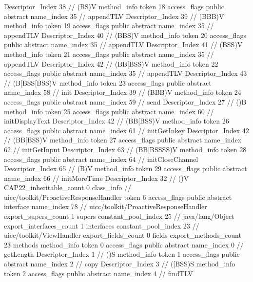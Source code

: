 {{{{{					Descriptor_Index	38		// (BS)V
				}
				method_info {
					token	18
					access_flags	public abstract
					name_index	35		// appendTLV
					Descriptor_Index	39		// (BBB)V
				}
				method_info {
					token	19
					access_flags	public abstract
					name_index	35		// appendTLV
					Descriptor_Index	40		// (BBS)V
				}
				method_info {
					token	20
					access_flags	public abstract
					name_index	35		// appendTLV
					Descriptor_Index	41		// (BSS)V
				}
				method_info {
					token	21
					access_flags	public abstract
					name_index	35		// appendTLV
					Descriptor_Index	42		// (BB[BSS)V
				}
				method_info {
					token	22
					access_flags	public abstract
					name_index	35		// appendTLV
					Descriptor_Index	43		// (B[BSS[BSS)V
				}
				method_info {
					token	23
					access_flags	public abstract
					name_index	58		// init
					Descriptor_Index	39		// (BBB)V
				}
				method_info {
					token	24
					access_flags	public abstract
					name_index	59		// send
					Descriptor_Index	27		// ()B
				}
				method_info {
					token	25
					access_flags	public abstract
					name_index	60		// initDisplayText
					Descriptor_Index	42		// (BB[BSS)V
				}
				method_info {
					token	26
					access_flags	public abstract
					name_index	61		// initGetInkey
					Descriptor_Index	42		// (BB[BSS)V
				}
				method_info {
					token	27
					access_flags	public abstract
					name_index	62		// initGetInput
					Descriptor_Index	63		// (BB[BSSSS)V
				}
				method_info {
					token	28
					access_flags	public abstract
					name_index	64		// initCloseChannel
					Descriptor_Index	65		// (B)V
				}
				method_info {
					token	29
					access_flags	public abstract
					name_index	66		// initMoreTime
					Descriptor_Index	32		// ()V
				}
			}
			CAP22_inheritable_count	0
		}
		class_info {		// uicc/toolkit/ProactiveResponseHandler
			token	6
			access_flags	public abstract interface
			name_index	78		// uicc/toolkit/ProactiveResponseHandler
			export_supers_count	1
			supers {
				constant_pool_index	25		// java/lang/Object
			}
			export_interfaces_count	1
			interfaces {
				constant_pool_index	23		// uicc/toolkit/ViewHandler
			}
			export_fields_count	0
			fields {
			}
			export_methods_count	23
			methods {
				method_info {
					token	0
					access_flags	public abstract
					name_index	0		// getLength
					Descriptor_Index	1		// ()S
				}
				method_info {
					token	1
					access_flags	public abstract
					name_index	2		// copy
					Descriptor_Index	3		// ([BSS)S
				}
				method_info {
					token	2
					access_flags	public abstract
					name_index	4		// findTLV
}}}}}
